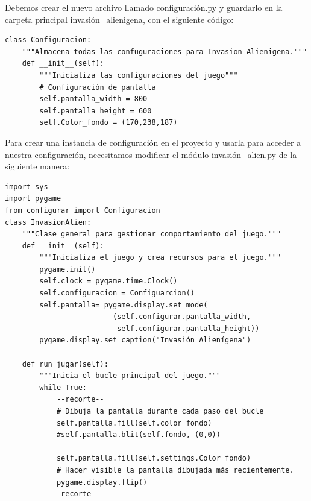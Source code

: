 Debemos crear el nuevo archivo llamado {\ttfamily configuración.py} y guardarlo en la carpeta principal {\ttfamily invasión\_alienigena}, con el siguiente código: 

\hspace{-2.75cm}{\ttfamily \scriptsize configurar.py}  \vspace{-0.5cm}
\begin{lstlisting}		
class Configuracion:
    """Almacena todas las confuguraciones para Invasion Alienigena."""
    def __init__(self):
        """Inicializa las configuraciones del juego"""
        # Configuración de pantalla
        self.pantalla_width = 800
        self.pantalla_height = 600
        self.Color_fondo = (170,238,187)
\end{lstlisting}

Para crear una instancia de configuración en el proyecto y usarla para acceder a nuestra configuración, necesitamos modificar el módulo {\ttfamily invasión\_alien.py} de la siguiente manera:



\hspace{-2.4cm}{\ttfamily \scriptsize invasión}

\vspace{-0.2cm}
\hspace{-2.1cm}{\ttfamily \scriptsize \_alien.py}\vspace{-0.84cm}
\begin{lstlisting}
import sys
import pygame
from configurar import Configuracion
class InvasionAlien:
    """Clase general para gestionar comportamiento del juego."""
    def __init__(self):
        """Inicializa el juego y crea recursos para el juego."""
        pygame.init()
        self.clock = pygame.time.Clock()
        self.configuracion = Configuarcion()
        self.pantalla= pygame.display.set_mode(
                         (self.configurar.pantalla_width,
                          self.configurar.pantalla_height))
        pygame.display.set_caption("Invasión Alienígena")

    def run_jugar(self):
        """Inicia el bucle principal del juego."""
        while True:
            --recorte--
            # Dibuja la pantalla durante cada paso del bucle
            self.pantalla.fill(self.color_fondo)
            #self.pantalla.blit(self.fondo, (0,0))

            self.pantalla.fill(self.settings.Color_fondo)
            # Hacer visible la pantalla dibujada más recientemente.
            pygame.display.flip()
           --recorte--
\end{lstlisting}


